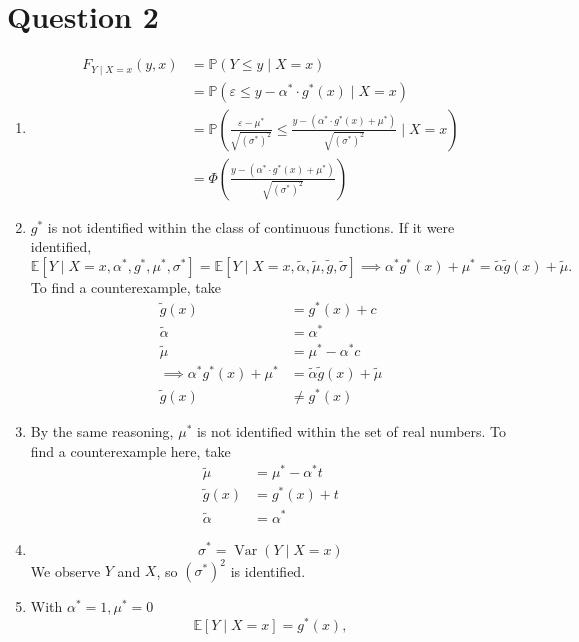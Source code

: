 \documentclass{article}
\newcommand{\p}{\mathbb{P}}
\newcommand{\E}{\mathbb{E}}
\newcommand{\Var}{\operatorname{Var}}
\begin{document}
\section*{Question 2}
\begin{enumerate}
\item
  \begin{align*}
    F_{Y \mid X = x} (y, x) &= \p(Y \le y \mid X = x)\\
                            &= \p(\varepsilon \le y - \alpha^\ast \cdot g^\ast (x) \mid X = x)\\
                            &= \p \left(\frac{\varepsilon - \mu^\ast}{\sqrt{(\sigma^\ast)^2}} \le \frac{y - (\alpha^\ast \cdot g^\ast (x) + \mu^\ast)}{\sqrt{(\sigma^\ast)^2}} \mid X = x\right)\\
    &= \Phi \left(\frac{y - (\alpha^\ast \cdot g^\ast(x) + \mu^\ast)}{\sqrt{(\sigma^\ast)^2}}\right)
  \end{align*}
\item $g^\ast$ is not identified within the class of continuous functions. If it were identified,
  \[
\E[Y \mid X = x, \alpha^\ast, g^\ast, \mu^\ast, \sigma^\ast] = \E[Y \mid X =x, \tilde{\alpha}, \tilde{\mu}, \tilde{g}, \tilde{\sigma}] \implies \alpha^\ast g^\ast (x) + \mu^\ast = \tilde{\alpha} \tilde{g} (x) + \tilde{\mu}.
\]
To find a counterexample, take
\begin{align*}
  \tilde{g}(x) &= g^\ast (x) + c\\
  \tilde{\alpha} &= \alpha^\ast\\
  \tilde{\mu} &= \mu^\ast - \alpha^\ast c\\
  \implies \alpha^\ast g^\ast(x) + \mu^\ast &= \tilde{\alpha} \tilde{g} (x) + \tilde{\mu}\\
  \tilde{g}(x) &\ne g^\ast (x)
\end{align*}
\item By the same reasoning, $\mu^\ast$ is not identified within the set of real numbers. To find a counterexample here, take
  \begin{align*}
    \tilde{\mu} &= \mu^\ast - \alpha^\ast t\\
    \tilde{g} (x) &= g^\ast (x) + t\\
    \tilde{\alpha} &= \alpha^\ast
  \end{align*}
\item \[
\sigma^\ast = \Var(Y \mid X = x)
\]
We observe $Y$ and $X$, so $(\sigma^\ast)^2$ is identified.
\item With $\alpha^\ast = 1, \mu^\ast = 0$
  \[
\E[Y \mid X = x] = g^\ast(x),
\]
\end{enumerate}
\end{document}
